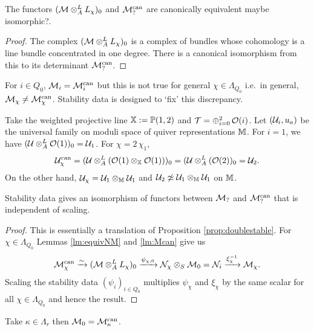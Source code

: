 \documentclass[12pt]{amsart}
\begin{document}
\begin{lemma}\label{lm:Mcan}
The functors $(\mathcal{M} \otimes_A^L L_\chi)_0$ and $\mathcal{M}_?^{\textup{can}}$ are canonically equivalent {\red maybe isomorphic?}.
\end{lemma}

\begin{proof}
The complex $(\mathcal{M} \otimes_A^L L_\chi)_0$ is a complex of bundles whose cohomology is a line bundle concentrated in one degree. 
There is a canonical isomorphism from this to its determinant $\mathcal{M}_?^{\text{can}}$.
\end{proof}

For $i \in Q_0$, $\mathcal{M}_i= \mathcal{M}_i^\text{can}$ but this is not true for general $\chi \in \Lambda_{Q_0}$ i.e.\ in general, $\mathcal{M}_\chi \neq \mathcal{M}_\chi^\text{can}$.
Stability data is designed to `fix' this discrepancy.

\begin{example}
Take the weighted projective line $\mathbb{X}:=\mathbb{P}(1,2)$ and $\mathcal{T}= \oplus_{i=0}^2 \,\mathcal{O}(i)$.
Let $(\mathcal{U}_i, u_a)$ be the universal family on moduli space of quiver representations $\mathbb{M}$.
For $i=1$, we have $(\mathcal{U} \otimes_A^L \mathcal{O}(1))_0 = \mathcal{U}_1$.
For $\chi= 2\,\chi_1$, $$\mathcal{U}_\chi^\text{can} = (\mathcal{U} \otimes_A^L (\mathcal{O}(1)\otimes_{\mathbb{X}} \mathcal{O}(1)))_0 = (\mathcal{U} \otimes_A^L (\mathcal{O}(2))_0 = \mathcal{U}_2.$$
On the other hand, $\mathcal{U}_\chi = \mathcal{U}_1 \otimes_{\mathbb{M}} \mathcal{U}_1$ and $\mathcal{U}_2 \not\simeq \mathcal{U}_1 \otimes_{\mathbb{M}} \mathcal{U}_1$ on $\mathbb{M}$.
\end{example}

\begin{proposition}\label{prop:can}
Stability data gives an isomorphism of functors between $\mathcal{M}_?$ and $\mathcal{M}_?^{\textup{can}}$ that is independent of scaling. 
\end{proposition}

\begin{proof}
This is essentially a translation of Proposition \ref{prop:doublestable}.
For $\chi \in \Lambda_{Q_0}$ Lemmas \ref{lm:equivNM} and \ref{lm:Mcan} give us
$$\mathcal{M}_\chi^\text{can} \xrightarrow{\sim} (\mathcal{M} \otimes_A^L L_\chi)_0 \xrightarrow{\psi_{\chi,0}} \mathcal{N}_\chi \otimes_S \mathcal{M}_0 = \mathcal{N}_i \xrightarrow{{\xi_\chi^{-1}}} \mathcal{M}_\chi.$$
Scaling the stability data $(\psi_i)_{i\in Q_0}$ multiplies $\psi_\chi$ and $\xi_\chi$ by the same scalar for all $\chi \in \Lambda_{Q_0}$ and hence the result.
\end{proof}

\begin{lemma}\label{lm:kappa0}
Take $\kappa \in \Lambda_r$ then $\mathcal{M}_0 = \mathcal{M}_\kappa^\textup{can}$.
\end{lemma}
\end{document}
